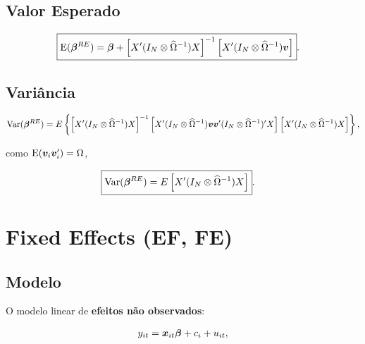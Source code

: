 \documentclass[11pt, oneside, a4paper, article]{article}
\numberwithin{equation}{section}
\begin{document}
\subsection*{Valor Esperado}

\vspace{-1 em}
\begin{align*}
	\Aboxed{
\E( \mbs{\beta}^{RE} ) = 
\mbs{\beta} +
\left[ X' (I_{N} \otimes \widehat{\Omega}^{-1}) X \right]^{-1}
\left[ X' (I_{N} \otimes \widehat{\Omega}^{-1}) \mbs{v} \right] }.
\end{align*}

\subsection*{Variância}

\vspace{-1 em}
\begin{align*} 
\text{Var}( \boldsymbol{\beta}^{RE} ) = 
E
\left\{ 
\left[ X' ( I_{N} \otimes \widehat{\Omega}^{-1} ) X \right]^{-1}
\left[
X' ( I_{N} \otimes \widehat{\Omega}^{-1} )
\boldsymbol{v} \boldsymbol{v}'
( I_{N} \otimes \widehat{\Omega}^{-1} )' X
\right]
\left[ X' ( I_{N} \otimes \widehat{\Omega}^{-1} ) X \right]
\right\},
\end{align*}

\noindent
como $\text{E}( \boldsymbol{v}_{i} \boldsymbol{v}_{i}' ) =\Omega$,

\vspace{-1 em}
\begin{align*} 
	\Aboxed{
\Var( \mbs{\beta}^{RE} ) = 
E
\left[ X' ( I_{N} \otimes \widehat{\Omega}^{-1} ) X \right] }.
\end{align*}

\clearpage
\section{Fixed Effects (EF, FE)}


\subsection*{Modelo}

O modelo linear de \textbf{efeitos não observados}:

\vspace{-1 em}
\begin{align} \label{mod1:FE}
	y_{it} = \boldsymbol{x}_{it} \boldsymbol{\beta} + c_{i} + u_{it},
\end{align}
\end{document}
